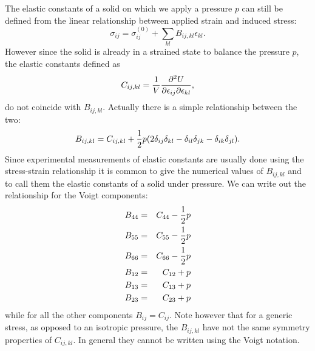 \documentclass[12pt,a4paper]{article}
\begin{document}
The elastic constants of a solid on which we apply a pressure $p$ can still
be defined from the linear relationship between applied strain and 
induced stress: 
\begin{equation}
\sigma_{ij} =\sigma^{(0)}_{ij}+\sum_{kl} B_{ij,kl} \epsilon_{kl}.
\end{equation}
However since the solid is already in a strained state
to balance the pressure $p$, the elastic constants defined as
\begin{equation}
C_{ij,kl}= 
{1 \over V}{\partial^2 U \over \partial \epsilon_{ij} \partial \epsilon_{kl}},
\end{equation}
do not coincide with $B_{ij,kl}$. Actually there is a simple 
relationship between the two:
\begin{equation}
B_{ij,kl} = C_{ij,kl} + {1\over 2} p (2 \delta_{ij} \delta_{kl} - 
 \delta_{il} \delta_{jk} - \delta_{ik} \delta_{jl} ).
\end{equation}
Since experimental measurements of elastic constants are usually done 
using the stress-strain relationship it is common to give the numerical
values of $B_{ij,kl}$ and to call them the elastic constants of a
solid under pressure. We can write out the relationship for the Voigt 
components:
\begin{eqnarray}
B_{44} &=& C_{44} - {1\over 2} p \\
B_{55} &=& C_{55} - {1\over 2} p \\
B_{66} &=& C_{66} - {1\over 2} p \\
B_{12} &=& C_{12} + p \\
B_{13} &=& C_{13} + p \\
B_{23} &=& C_{23} + p 
\end{eqnarray}
while for all the other components $B_{ij}=C_{ij}$.
Note however that for a generic stress, as opposed to 
an isotropic pressure, the $B_{ij,kl}$ have not the same symmetry properties 
of $C_{ij,kl}$. In general they cannot be written using the Voigt notation.
\end{document}
